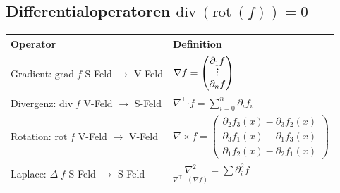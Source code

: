 \documentclass[6pt,a4paper]{scrartcl}
\let\olddot = \dot
\newcommand{\vect}[1]{\ensuremath{\begin{pmatrix} #1 \end{pmatrix}}}							%
\newcommand{\bdot}{\ensuremath{\boldsymbol \cdot}} 												%
\newcommand{\svdots}{\ensuremath{\olddot :}}													%
\renewcommand*{\dot}[1]{\accentset{\mbox{\textrm{\large\bfseries .}} }{#1}}						%
\renewcommand{\div}{\ensuremath{\mathrm{div}\ }}								%
\newcommand{\rot}{\ensuremath{\mathrm{rot}\ }}									%
\begin{document}
\begin{multicols*}{4}
\subsection{Differentialoperatoren \qquad $\div(\rot(f)) = 0$}
\begin{tabular}{l|l}
	Operator & Definition \\ \midrule
	\pbox{2.0cm}{ Gradient: $\mathrm{grad}\; f$ \\ S-Feld $\rightarrow$ V-Feld } & $\nabla f = \vect{\partial_1 f \\ \svdots \\ \partial_n f}$ \\ \midrule
	\pbox{2.0cm}{ Divergenz: $\mathrm{div}\; f$ \\ V-Feld $\rightarrow$ S-Feld } & ${\displaystyle \nabla^\top \bdot f = \sum\limits_{i=0}^n \partial_i f_i}$\\ \midrule %
	\pbox{2.0cm}{ Rotation: $\mathrm{rot}\; f$ \\ V-Feld $\rightarrow$ V-Feld } & $\nabla \times f = \vect{\partial_2 f_3(x) - \partial_3 f_2(x) \\[2pt] \partial_3 f_1(x) -\partial_1 f_3(x) \\[2pt] \partial_1 f_2(x) -\partial_2 f_1(x) }$ \\ \midrule
	\pbox{2.0cm}{ Laplace: $\Delta\; f$ \\ S-Feld $\rightarrow$ S-Feld } & ${\displaystyle\underset{\nabla^\top \cdot (\nabla f)}{\nabla^2} = \sum \partial_i^2 f}$ %
\end{tabular}



\end{multicols*}
\end{document}
